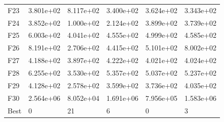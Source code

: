 \begin{tabular}{llllll}
F23  &  3.801e+02 &  8.117e+02 &  3.400e+02 &  3.624e+02 &  3.343e+02 \\
F24  &  3.852e+02 &  1.000e+02 &  2.124e+02 &  3.899e+02 &  3.739e+02 \\
F25  &  6.003e+02 &  4.041e+02 &  4.555e+02 &  4.999e+02 &  4.585e+02 \\
F26  &  8.191e+02 &  2.706e+02 &  4.415e+02 &  5.101e+02 &  8.002e+02 \\
F27  &  4.188e+02 &  3.897e+02 &  4.222e+02 &  4.021e+02 &  4.024e+02 \\
F28  &  6.255e+02 &  3.530e+02 &  5.357e+02 &  5.037e+02 &  5.237e+02 \\
F29  &  4.128e+02 &  2.578e+02 &  3.599e+02 &  3.736e+02 &  4.035e+02 \\
F30  &  2.564e+06 &  8.052e+04 &  1.691e+06 &  7.956e+05 &  1.583e+06 \\
Best &          0 &         21 &          6 &          0 &          3 \\
\bottomrule
\end{tabular}
